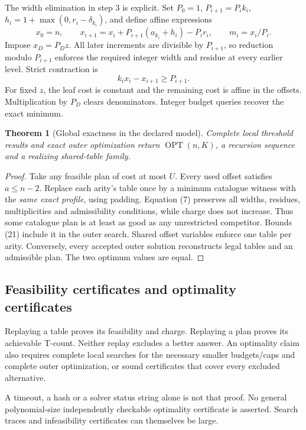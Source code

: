 \documentclass[11pt,letterpaper]{article}
\newcommand{\OPT}{\operatorname{OPT}}
\newtheorem{theorem}{Theorem}[section]
\begin{document}
The width elimination in step 3 is explicit. Set
\(P_0=1\), \(P_{i+1}=P_i k_i\),
\(h_i=1+\max(0,r_i-\delta_{k_i})\), and define affine expressions
\[
x_0=n,\qquad
x_{i+1}=x_i+P_{i+1}(a_{k_i}+h_i)-P_i r_i,\qquad
m_i=x_i/P_i.
\tag{22}
\]
Impose \(x_D=P_Dz\). All later increments are divisible by
\(P_{i+1}\), so reduction modulo \(P_{i+1}\) enforces the required
integer width and residue at every earlier level.
Strict contraction is
\[
k_i x_i-x_{i+1}\ge P_{i+1}.
\tag{23}
\]
For fixed \(z\), the leaf cost is constant and the remaining cost is
affine in the offsets. Multiplication by \(P_D\) clears denominators.
Integer budget queries recover the exact minimum.

\begin{theorem}[Global exactness in the declared model]
Complete local threshold results and exact outer optimization return
\(\OPT(n,K)\), a recursion sequence and a realizing shared-table family.
\end{theorem}
\begin{proof}
Take any feasible plan of cost at most \(U\). Every used offset
satisfies \(a\le n-2\). Replace each arity's table once by a minimum
catalogue witness with the \emph{same exact profile}, using padding.
Equation (7) preserves all widths, residues, multiplicities and
admissibility conditions, while charge does not increase.
Thus some catalogue plan is at least as good as any unrestricted
competitor. Bounds (21) include it in the outer search.
Shared offset variables enforce one table per arity.
Conversely, every accepted outer solution reconstructs legal tables
and an admissible plan. The two optimum values are equal.
\end{proof}

\clearpage
\subsection{Feasibility certificates and optimality certificates}
Replaying a table proves its feasibility and charge. Replaying a
plan proves its achievable T-count. Neither replay excludes a better
answer. An optimality claim also requires complete local searches
for the necessary smaller budgets/caps and complete outer optimization,
or sound certificates that cover every excluded alternative.

A timeout, a hash or a solver status string alone is not that proof.
No general polynomial-size independently checkable optimality
certificate is asserted. Search traces and infeasibility certificates
can themselves be large.
\end{document}
